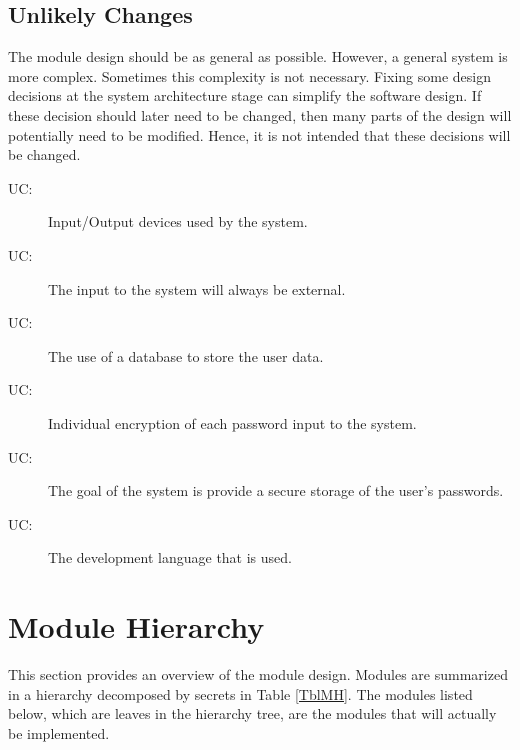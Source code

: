 \documentclass[12pt, titlepage]{article}
\newcounter{ucnum}
\newcommand{\uctheucnum}{UC\theucnum}
\begin{document}
\subsection{Unlikely Changes} \label{SecUchange}

The module design should be as general as possible. However, a general system is
more complex. Sometimes this complexity is not necessary. Fixing some design
decisions at the system architecture stage can simplify the software design. If
these decision should later need to be changed, then many parts of the design
will potentially need to be modified. Hence, it is not intended that these
decisions will be changed.

\begin{description}
  \item[ \uctheucnum \label{ucIO}:] Input/Output devices
  used by the system.
  \item[ \uctheucnum \label{ucInput}:] The input to the 
  system will always be external.
  \item[ \uctheucnum \label{ucDBase}:] The use of a database to store the user data.
  \item[ \uctheucnum \label{ucPassEncrypt}:] Individual encryption of each password input to the system.
  \item[ \uctheucnum \label{ucPurpose}:] The goal of the system is provide a secure storage of the user's passwords.
  \item[ \uctheucnum \label{ucLanguage}:] The development language that is used.

\end{description}

\section{Module Hierarchy} \label{SecMH}

This section provides an overview of the module design. Modules are summarized
in a hierarchy decomposed by secrets in Table \ref{TblMH}. The modules listed
below, which are leaves in the hierarchy tree, are the modules that will
actually be implemented.
\end{document}
